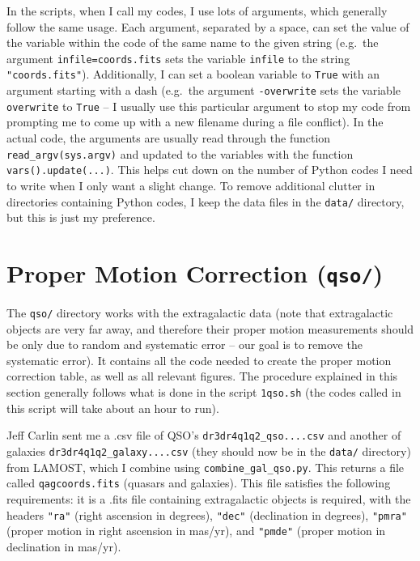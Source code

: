 \documentclass{article}
\begin{document}
In the scripts, when I call my codes, I use lots of arguments, which generally follow the same usage. Each argument, separated by a space, can set the value of the variable within the code of the same name to the given string (e.g.\ the argument \texttt{infile=coords.fits} sets the variable \texttt{infile} to the string \texttt{"coords.fits"}). Additionally, I can set a boolean variable to \texttt{True} with an argument starting with a dash (e.g.\ the argument \texttt{-overwrite} sets the variable \texttt{overwrite} to \texttt{True} -- I usually use this particular argument to stop my code from prompting me to come up with a new filename during a file conflict). In the actual code, the arguments are usually read through the function \texttt{read\_argv(sys.argv)} and updated to the variables with the function \texttt{vars().update(...)}. This helps cut down on the number of Python codes I need to write when I only want a slight change. To remove additional clutter in directories containing Python codes, I keep the data files in the \texttt{data/} directory, but this is just my preference.

\section{Proper Motion Correction (\texttt{qso/})} \label{sec:qso}

The \texttt{qso/} directory works with the extragalactic data (note that extragalactic objects are very far away, and therefore their proper motion measurements should be only due to random and systematic error -- our goal is to remove the systematic error). It contains all the code needed to create the proper motion correction table, as well as all relevant figures. The procedure explained in this section generally follows what is done in the script \texttt{1qso.sh} (the codes called in this script will take about an hour to run).

Jeff Carlin sent me a .csv file of QSO's \texttt{dr3dr4q1q2\_qso....csv} and another of galaxies \texttt{dr3dr4q1q2\_galaxy....csv} (they should now be in the \texttt{data/} directory) from LAMOST, which I combine using \texttt{combine\_gal\_qso.py}. This returns a file called \texttt{qagcoords.fits} (quasars and galaxies). This file satisfies the following requirements: it is a .fits file containing extragalactic objects is required, with the headers \texttt{"ra"} (right ascension in degrees), \texttt{"dec"} (declination in degrees), \texttt{"pmra"} (proper motion in right ascension in mas/yr), and \texttt{"pmde"} (proper motion in declination in mas/yr).
\end{document}
